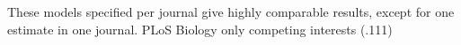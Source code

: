 These models specified per journal give highly comparable results, except for one estimate in one journal. PLoS Biology only competing interests (.111)